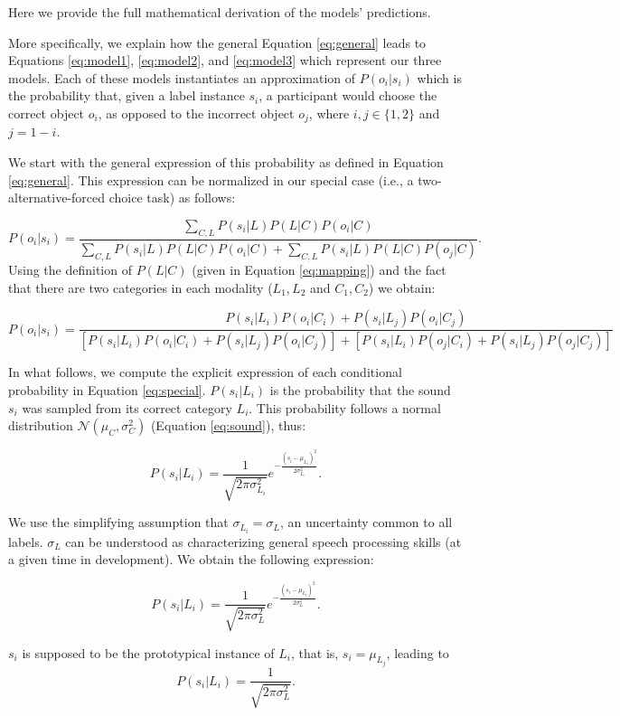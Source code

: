 \documentclass[english,,man]{apa6}
\begin{document}
Here we provide the full mathematical derivation of the models' predictions.

More specifically, we explain how the general Equation \ref{eq:general} leads to Equations \ref{eq:model1}, \ref{eq:model2}, and \ref{eq:model3} which represent our three models. Each of these models instantiates an approximation of \(P(o_i|s_i)\) which is the probability that, given a label instance \(s_i\), a participant would choose the correct object \(o_i\), as opposed to the incorrect object \(o_{j}\), where \(i, j \in \{1,2\}\) and \(j = 1-i\).

We start with the general expression of this probability as defined in Equation \ref{eq:general}. This expression can be normalized in our special case (i.e., a two-alternative-forced choice task) as follows:

\[P(o_i|s_i) = \frac{\sum_{C,L} P(s_i|L)P(L|C)P(o_i|C)}{\sum_{C,L}  P(s_i|L)P(L|C)P(o_i|C) + \sum_{C,L}  P(s_i|L)P(L|C)P(o_j|C)}.\]
Using the definition of \(P(L|C)\) (given in Equation \ref{eq:mapping}) and the fact that there are two categories in each modality (\(L_1, L_2\) and \(C_1, C_2\)) we obtain:

\begin{equation} \label{eq:special}
P(o_i|s_i) = \frac{P(s_i|L_i)P(o_i|C_i) + P(s_i|L_j)P(o_i|C_j)}{[P(s_i|L_i)P(o_i|C_i) + P(s_i|L_j)P(o_i|C_j)] + [P(s_i|L_i)P(o_j|C_i) + P(s_i|L_j)P(o_j|C_j)]}
\end{equation}

In what follows, we compute the explicit expression of each conditional probability in Equation \ref{eq:special}. \(P(s_i | L_i)\) is the probability that the sound \(s_i\) was sampled from its correct category \(L_i\). This probability follows a normal distribution \(\mathcal{N}(\mu_C, \sigma^2_C)\) (Equation \ref{eq:sound}), thus:

\[P(s_i|L_i) = \frac{1}{\sqrt{2\pi\sigma^2_{L_i}}}e^{-\frac{(s_i-\mu_{L_j})^2}{2\sigma^2_{L_i}}}.\]

We use the simplifying assumption that \(\sigma_{L_i} = \sigma_L\), an uncertainty common to all labels. \(\sigma_L\) can be understood as characterizing general speech processing skills (at a given time in development). We obtain the following expression:

\[P(s_i | L_i) = \frac{1}{\sqrt{2\pi\sigma^2_L}} e^{-\frac{(s_i-\mu_{L_j})^2}{2\sigma^2_L}}.\]

\(s_i\) is supposed to be the prototypical instance of \(L_i\), that is, \(s_i=\mu_{L_j}\), leading to \[P(s_i | L_i) = \frac{1}{\sqrt{2\pi\sigma^2_L}}.\]
\end{document}
